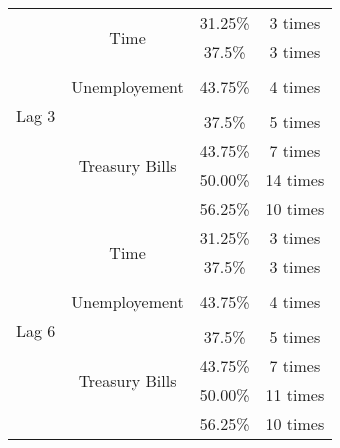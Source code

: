 \begin{table}[t]
\begin{tabular}{lccc}
    \multicolumn{1}{c|}{\multirow{9}{*}{Lag 3}}     & \multirow{2}{*}{Time}             & 31.25\%                   & 3 times \\
    \multicolumn{1}{c|}{}                           &                                   & 37.5\%                    & 3 times \\
    \multicolumn{1}{c|}{}                           &                                   &                           &          \\    
    \multicolumn{1}{c|}{}                           & Unemployement                     & 43.75\%                   & 4 times \\
    \multicolumn{1}{c|}{}                           &                                   &                           &          \\    
    \multicolumn{1}{c|}{}                           & \multirow{4}{*}{Treasury Bills}   & 37.5\%                    & 5 times \\
    \multicolumn{1}{c|}{}                           &                                   & 43.75\%                   & 7 times  \\
    \multicolumn{1}{c|}{}                           &                                   & 50.00\%                   & 14 times  \\ 
    \multicolumn{1}{c|}{}                           &                                   & 56.25\%                   & 10 times  \\ \cline{1-4}

    \multicolumn{1}{c|}{\multirow{9}{*}{Lag 6}}     & \multirow{2}{*}{Time}             & 31.25\%                   & 3 times \\
    \multicolumn{1}{c|}{}                           &                                   & 37.5\%                    & 3 times \\
    \multicolumn{1}{c|}{}                           &                                   &                           &          \\    
    \multicolumn{1}{c|}{}                           & Unemployement                     & 43.75\%                   & 4 times \\
    \multicolumn{1}{c|}{}                           &                                   &                           &          \\    
    \multicolumn{1}{c|}{}                           & \multirow{4}{*}{Treasury Bills}   & 37.5\%                    & 5 times \\
    \multicolumn{1}{c|}{}                           &                                   & 43.75\%                   & 7 times  \\
    \multicolumn{1}{c|}{}                           &                                   & 50.00\%                   & 11 times  \\ 
    \multicolumn{1}{c|}{}                           &                                   & 56.25\%                   & 10 times  \\ \cline{1-4}


\end{tabular}
\end{table}

